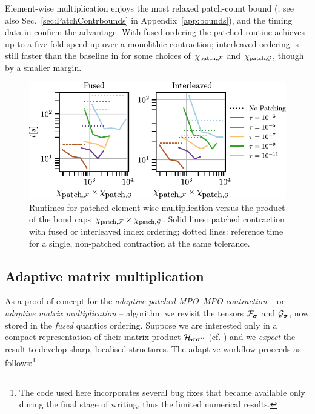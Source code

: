 Element-wise multiplication enjoys the most relaxed patch-count bound (; see also
Sec.~\ref{sec:PatchContrbounds} in Appendix~\ref{app:bounds}), and the timing
data in  confirm the advantage. With fused ordering the patched routine achieves up to a five-fold speed-up
over a monolithic contraction; interleaved ordering is still faster than the baseline in for some choices of $\chi_{\text{patch},\mathcal{F}}$ and $\chi_{\text{patch},\mathcal{G}}$, though by a smaller margin.



\begin{figure}[ht!]
    \centering
    \includegraphics{figures/elemmulTimeResults.pdf}
    \caption{Runtimes for patched element-wise multiplication versus the product of the bond caps \(\chi_{\text{patch},\mathcal{F}}\times\chi_{\text{patch},\mathcal{G}}\). Solid lines: patched contraction with fused or interleaved index ordering; dotted lines: reference time for a single, non-patched contraction at the same tolerance. }
    \label{fig:elemMulResults}
\end{figure}

\subsection{Adaptive matrix multiplication}


As a proof of concept for the \emph{adaptive patched MPO–MPO contraction} -- or \textit{adaptive matrix multiplication} -- algorithm we revisit the tensors \(\mathcal{F}_{\boldsymbol{\sigma}}\) and \(\mathcal{G}_{\boldsymbol{\sigma}}\), now stored in the \emph{fused} quantics ordering.  Suppose we are interested only in a compact representation of
their matrix product $\mathcal H_{\boldsymbol{\sigma}\boldsymbol{\sigma}''}$ (cf. ) and we \emph{expect} the result to develop sharp, localised structures.
The adaptive workflow proceeds as follows:\footnote{The code used here
incorporates several bug fixes that became available only during the final
stage of writing, thus the limited numerical results.}



